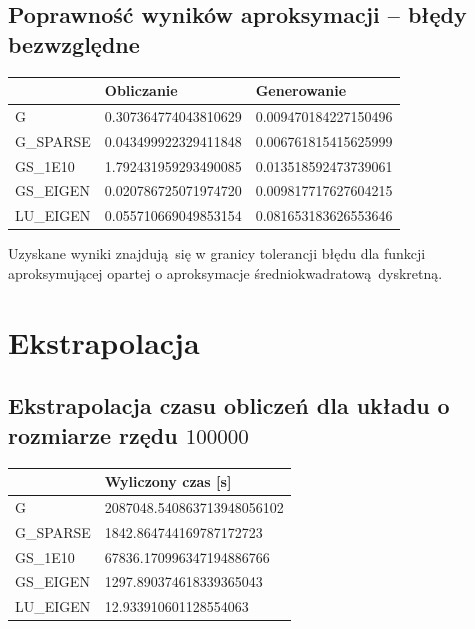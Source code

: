\documentclass[10pt]{article}
\newenvironment{corollary}[2][Wniosek]{\begin{trivlist}
\item[\hskip \labelsep {\bfseries #1}\hskip \labelsep {\bfseries #2.}]}{\end{trivlist}}
\begin{document}
\subsection{Poprawność wyników aproksymacji – błędy bezwzględne}
\begin{center}
		\begin{tabular}{|C{2.5cm}| C{5cm}|C{5cm}|}
			\hline
			\textbf{} & \textbf{Obliczanie} & \textbf{Generowanie} \\ \hline
			{G} & 0.307364774043810629 & 0.009470184227150496  \\ \hline
			{G\_SPARSE} & 0.043499922329411848 & 0.006761815415625999 \\  \hline
			{GS\_1E10} & 1.792431959293490085 & 0.013518592473739061 \\  \hline
			{GS\_EIGEN} & 0.020786725071974720 & 0.009817717627604215\\ \hline
			{LU\_EIGEN} & 0.055710669049853154 & 0.081653183626553646\\ \hline
		\end{tabular}
\end{center}
\begin{corollary}{1}
	Uzyskane wyniki znajdują się w granicy tolerancji błędu dla funkcji aproksymującej opartej o aproksymacje średniokwadratową dyskretną.

\end{corollary}

\section{Ekstrapolacja}
\subsection{Ekstrapolacja czasu obliczeń dla układu o rozmiarze rzędu $100 000$}
\begin{center}
	\begin{tabular}{|C{2.5cm}|C{5cm}|}
		\hline
		\textbf{} & \textbf{Wyliczony czas [s]}\\ \hline
		{G} & 2087048.540863713948056102 \\ \hline
		{G\_SPARSE} & 1842.864744169787172723 \\  \hline
		{GS\_1E10} & 67836.170996347194886766 \\  \hline
		{GS\_EIGEN} & 1297.890374618339365043 \\ \hline
		{LU\_EIGEN} & 12.933910601128554063 \\ \hline
	\end{tabular}
\end{center}
	
\end{document}
